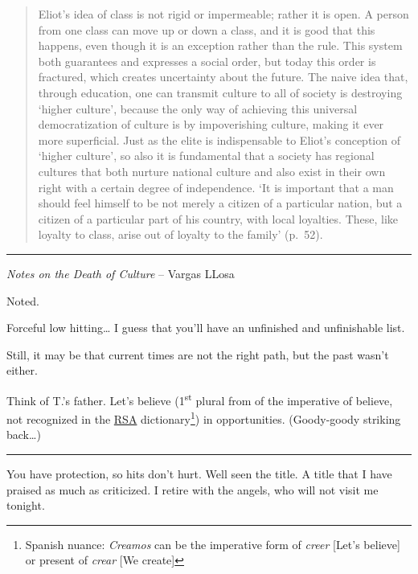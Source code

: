 \documentclass[]{book}
\let\rmarkdownfootnote\footnote%
\def\footnote{\protect\rmarkdownfootnote}
\begin{document}
\begin{quote}
Eliot's idea of class is not rigid or impermeable; rather it is open. A person from one class can move up or down a class, and it is good that this happens, even though it is an exception rather than the rule. This system both guarantees and expresses a social order, but today this order is fractured, which creates uncertainty about the future. The naive idea that, through education, one can transmit culture to all of society is destroying `higher culture', because the only way of achieving this universal democratization of culture is by impoverishing culture, making it ever more superficial. Just as the elite is indispensable to Eliot's conception of `higher culture', so also it is fundamental that a society has regional cultures that both nurture national culture and also exist in their own right with a certain degree of independence. `It is important that a man should feel himself to be not merely a citizen of a particular nation, but a citizen of a particular part of his country, with local loyalties. These, like loyalty to class, arise out of loyalty to the family' (p.~52).
\end{quote}

\begin{center}\rule{0.5\linewidth}{\linethickness}\end{center}

\emph{Notes on the Death of Culture} -- Vargas LLosa \citep{llosa2015notes}

Noted.

Forceful low hitting\ldots{} I guess that you'll have an unfinished and unfinishable list.

Still, it may be that current times are not the right path, but the past wasn't either.

Think of T.'s father. Let's believe (1\textsuperscript{st} plural from of the imperative of believe, not recognized in the \href{https://en.wikipedia.org/wiki/Royal_Spanish_Academy}{RSA} dictionary\footnote{Spanish nuance: \emph{Creamos} can be the imperative form of \emph{creer} {[}Let's believe{]} or present of \emph{crear} {[}We create{]} }) in opportunities. (Goody-goody striking back\ldots)

\begin{center}\rule{0.5\linewidth}{\linethickness}\end{center}

You have protection, so hits don't hurt. Well seen the title. A title that I have praised as much as criticized. I retire with the angels, who will not visit me tonight.
\end{document}
